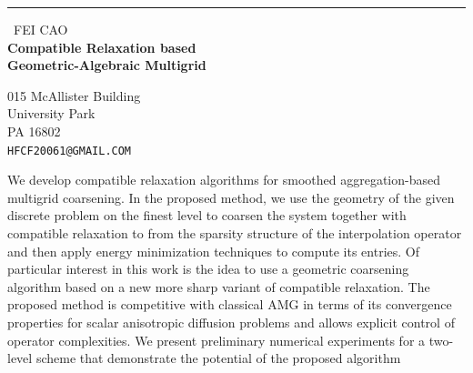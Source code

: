 \documentclass{report}
\begin{document}
\begin{center}
\rule{6in}{1pt} \
{\large FEI CAO \\
{\bf Compatible Relaxation based \\ Geometric-Algebraic Multigrid}}

015 McAllister Building \\ University Park \\ PA 16802
\\
{\tt HFCF20061@GMAIL.COM}\end{center}

We develop compatible relaxation algorithms for smoothed
aggregation-based multigrid coarsening.
In the proposed method, we use the geometry of the given discrete problem
on the finest level
to coarsen the system together with compatible relaxation
to from the sparsity structure of the interpolation operator and then
apply energy minimization techniques to compute its entries.
Of particular interest in this work is the idea to use a geometric
coarsening algorithm based on a new more sharp variant of compatible
relaxation. The proposed method is competitive with classical AMG in
terms of its convergence properties for scalar anisotropic diffusion
problems and allows explicit control of operator complexities. We present
preliminary numerical experiments for a two-level scheme that demonstrate
the potential of the proposed algorithm
\end{document}
